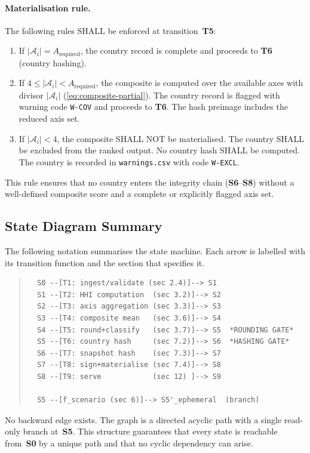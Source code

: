 \paragraph{Materialisation rule.}
The following rules SHALL be enforced at transition~\textbf{T5}:

\begin{enumerate}
  \item If \(|\mathcal{A}_i| = A_{\mathrm{required}}\), the country record
    is complete and proceeds to \textbf{T6} (country hashing).

  \item If \(4 \leq |\mathcal{A}_i| < A_{\mathrm{required}}\), the composite
    is computed over the available axes with divisor
    \(|\mathcal{A}_i|\) (\cref{eq:composite-partial}).  The country record
    is flagged with warning code \texttt{W-COV} and proceeds to
    \textbf{T6}.  The hash preimage includes the reduced axis set.

  \item If \(|\mathcal{A}_i| < 4\), the composite SHALL NOT be materialised.
    The country SHALL be excluded from the ranked output.  No country
    hash SHALL be computed.  The country is recorded in
    \texttt{warnings.csv} with code \texttt{W-EXCL}.
\end{enumerate}

This rule ensures that no country enters the integrity chain
(\textbf{S6}--\textbf{S8}) without a well-defined composite score
and a complete or explicitly flagged axis set.

\subsection{State Diagram Summary}\label{sec:state:diagram}

The following notation summarises the state machine.  Each arrow is labelled
with its transition function and the section that specifies it.

\begin{quote}\small
\begin{verbatim}
  S0 --[T1: ingest/validate (sec 2.4)]--> S1
  S1 --[T2: HHI computation  (sec 3.2)]--> S2
  S2 --[T3: axis aggregation (sec 3.3)]--> S3
  S3 --[T4: composite mean   (sec 3.6)]--> S4
  S4 --[T5: round+classify   (sec 3.7)]--> S5  *ROUNDING GATE*
  S5 --[T6: country hash     (sec 7.2)]--> S6  *HASHING GATE*
  S6 --[T7: snapshot hash    (sec 7.3)]--> S7
  S7 --[T8: sign+materialise (sec 7.4)]--> S8
  S8 --[T9: serve            (sec 12) ]--> S9

  S5 --[f_scenario (sec 6)]--> S5'_ephemeral  (branch)
\end{verbatim}
\end{quote}

No backward edge exists.  The graph is a directed acyclic path with a
single read-only branch at~\textbf{S5}.  This structure guarantees that
every state is reachable from~\textbf{S0} by a unique path and that no
cyclic dependency can arise.
